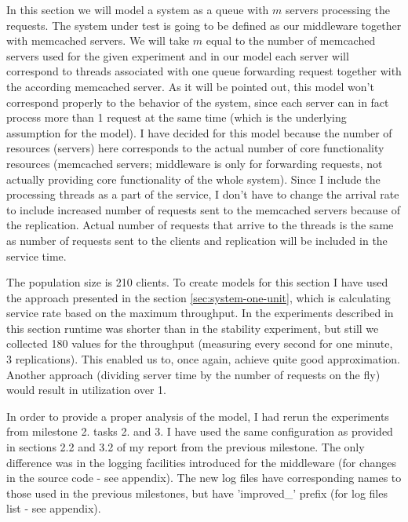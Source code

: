 \documentclass[11pt]{article}
\begin{document}
In this section we will model a system as a queue with $m$ servers processing the requests. The system under test is going to be defined as our middleware together with memcached servers. We will take $m$ equal to the number of memcached servers used for the given experiment and in our model each server will correspond to threads associated with one queue forwarding request together with the according memcached server. As it will be pointed out, this model won't correspond properly to the behavior of the system, since each server can in fact process more than 1 request at the same time (which is the underlying assumption for the model). I have decided for this model because the number of resources (servers) here corresponds to the actual number of core functionality resources (memcached servers; middleware is only for forwarding requests, not actually providing core functionality of the whole system). Since I include the processing threads as a part of the service, I don't have to change the arrival rate to include increased number of requests sent to the memcached servers because of the replication. Actual number of requests that arrive to the threads is the same as number of requests sent to the clients and replication will be included in the service time.

The population size is 210 clients. To create models for this section I have used the approach presented in the section \ref{sec:system-one-unit}, which is calculating service rate based on the maximum throughput. In the experiments described in this section runtime was shorter than in the stability experiment, but still we collected 180 values for the throughput (measuring every second for one minute, 3 replications). This enabled us to, once again, achieve quite good approximation. Another approach (dividing server time by the number of requests on the fly) would result in utilization over 1.

In order to provide a proper analysis of the model, I had rerun the experiments from milestone 2. tasks 2. and 3. I have used the same configuration as provided in sections 2.2 and 3.2 of my report from the previous milestone. The only difference was in the logging facilities introduced for the middleware (for changes in the source code - see appendix). The new log files have corresponding names to those used in the previous milestones, but have 'improved\_' prefix (for log files list - see appendix).
\end{document}
